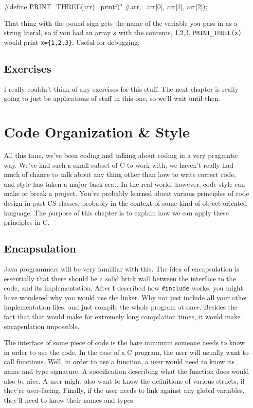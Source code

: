 \documentclass[ebook,11pt,oneside,openany]{memoir}
\newcommand{\cf}[1]{\texttt{#1}}
\begin{document}
\begin{code}[language=C]
#define PRINT_THREE(arr) \
        printf("%
        #arr, \
        arr[0], arr[1], arr[2]);
\end{code}

That thing with the pound sign gets the name of the variable you pass in as a string literal, so if you had an array \cf{x} with the contents, 1,2,3, \cf{PRINT\_THREE(x)} would print \cf{x=\{1,2,3\}}. Useful for debugging.

\section{Exercises}

I really couldn't think of any exercises for this stuff. The next chapter is really going to just be applications of stuff in this one, so we'll wait until then.

\chapter{Code Organization \& Style}
\label{ch:org}
All this time, we've been coding and talking about coding in a very pragmatic way. We've had such a small subset of C to work with, we haven't really had much of chance to talk about any thing other than how to write correct code, and style has taken a major back seat. In the real world, however, code style can make or break a project. You've probably learned about various principles of code design in past CS classes, probably in the context of some kind of object-oriented language. The purpose of this chapter is to explain how we can apply these principles in C.

\section{Encapsulation}

Java programmers will be very familliar with this. The idea of encapsulation is essentially that there should be a solid brick wall between the interface to the code, and its implementation. After I described how \cf{\#include} works, you might have wondered why you would use the linker. Why not just include all your other implementation files, and just compile the whole program at once. Besides the fact that that would make for extremely long compilation times, it would make encapsulation impossible.

The interface of some piece of code is the bare minimum someone needs to know in order to use the code. In the case of a C program, the user will usually want to call functions. Well, in order to use a function, a user would need to know its name and type signature. A specification describing what the function does would also be nice. A user might also want to know the definitions of various structs, if they're user-facing. Finally, if the user needs to link against any global variables, they'll need to know their names and types.
\end{document}
